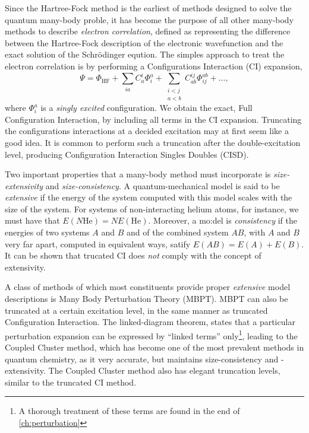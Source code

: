     Since the Hartree-Fock method is the earliest of methods designed to solve the quantum 
    many-body proble, it has become the purpose of all other many-body methods to describe 
    \emph{electron correlation}, defined as representing the difference between the 
    Hartree-Fock description of the electronic wavefunction and the exact solution of 
    the Schrödinger eqution. The simples approach to treat the electron correlation
    is by performing a Configurations Interaction (CI) expansion,
    \begin{equation}
        \Psi = \Phi_\text{HF} 
            + \sum_{ia} C^i_a\Phi^a_i 
            + \sum_{\substack{i < j \\ a < b}} C^{ij}_{ab} \Phi^{ab}_{ij} + \dots,
    \end{equation}
    where $\Phi^a_i$ is a \emph{singly excited} configuration. We obtain the exact,
    Full Configuration Interaction, by including all terms in the CI expansion.
    Truncating the configurations interactions at a decided excitation may at first 
    seem like a good idea. It is common to perform such a truncation after the 
    double-excitation level, producing Configuration Interaction Singles Doubles (CISD).

    Two important properties that a many-body method must incorporate is \emph{size-extensivity}
    and \emph{size-consistency}. A quantum-mechanical model is said to be \emph{extensive}
    if the energy of the system computed with this model scales with the size of the 
    system\cite{bartlett1978many}. For systems of non-interacting helium atoms, for instance,
    we must have that $E(N\text{He}) = NE(\text{He})$. Moreover, a mo:del is \emph{consistency}
    if the energies of two systems $A$ and $B$ and of the combined system $AB$, with 
    $A$ and $B$ very far apart, computed in equivalent ways, satify
    $E(AB) = E(A) + E(B)$\citeauthor{pople1976theoretical}. It can be shown that 
    trucated CI does \emph{not} comply with the concept of
    extensivity\cite{shavitt2009many}.

    A class of methods of which most constituents provide proper \emph{extensive} model
    descriptions is Many Body Perturbation Theory (MBPT)\cite{brueckner1955approximate}.
    MBPT can also be truncated at a certain 
    excitation level, in the same manner as truncated Configuration Interaction. 
    The linked-diagram theorem\cite{goldstone1957derivation}, states that a 
    particular perturbation expansion can be expressed by ``linked terms''
    only\footnote{A thorough treatment of these terms are found in the end of
    \autoref{ch:perturbation}},
    leading to the Coupled Cluster method\cite{coester1958bound,coester1960short},
    which has become one of the most prevalent methods in quantum chemistry,
    as it very accurate, but maintains size-consistency and -extensivity.
    The Coupled Cluster method also has elegant truncation levels, similar to the 
    truncated CI method.

